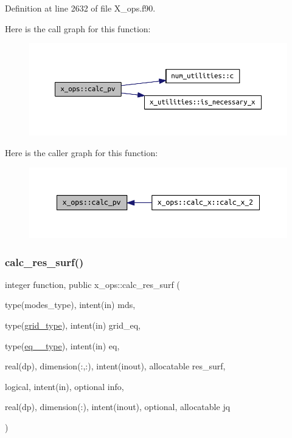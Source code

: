 Definition at line 2632 of file X\+\_\+ops.\+f90.

Here is the call graph for this function\+:\nopagebreak
\begin{figure}[H]
\begin{center}
\leavevmode
\includegraphics[width=350pt]{namespacex__ops_a51f3bf0b4c8d688ffbcc3a1adbca9762_cgraph}
\end{center}
\end{figure}
Here is the caller graph for this function\+:\nopagebreak
\begin{figure}[H]
\begin{center}
\leavevmode
\includegraphics[width=350pt]{namespacex__ops_a51f3bf0b4c8d688ffbcc3a1adbca9762_icgraph}
\end{center}
\end{figure}
\mbox{\label{namespacex__ops_a1a90026bbbeddc25e82cfdd304df251f}} 
\subsubsection{\texorpdfstring{calc\+\_\+res\+\_\+surf()}{calc\_res\_surf()}}
{\footnotesize\ttfamily integer function, public x\+\_\+ops\+::calc\+\_\+res\+\_\+surf (\begin{DoxyParamCaption}\item[{type(modes\+\_\+type), intent(in)}]{mds,  }\item[{type(\hyperlink{structgrid__vars_1_1grid__type}{grid\+\_\+type}), intent(in)}]{grid\+\_\+eq,  }\item[{type(\hyperlink{structeq__vars_1_1eq__1__type}{eq\+\_\+1\+\_\+type}), intent(in)}]{eq,  }\item[{real(dp), dimension(\+:,\+:), intent(inout), allocatable}]{res\+\_\+surf,  }\item[{logical, intent(in), optional}]{info,  }\item[{real(dp), dimension(\+:), intent(inout), optional, allocatable}]{jq }\end{DoxyParamCaption})}



